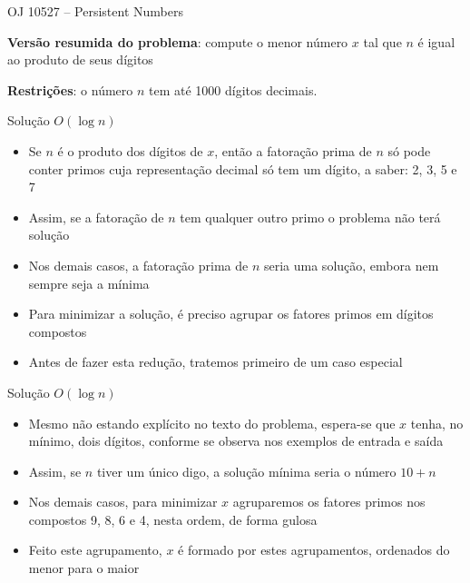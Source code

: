 \begin{frame}[fragile]{OJ 10527 -- Persistent Numbers}

    \textbf{Versão resumida do problema}: compute o menor número $x$ tal que $n$ é igual ao 
        produto de seus dígitos
    \vspace{0.1in}

    \textbf{Restrições}: o número $n$ tem até 1000 dígitos decimais.
\end{frame}

\begin{frame}[fragile]{Solução $O(\log n)$}

    \begin{itemize}
        \item Se $n$ é o produto dos dígitos de $x$, então a fatoração prima de $n$ só pode
            conter primos cuja representação decimal só tem um dígito, a saber: 2, 3, 5 e 7

        \item Assim, se a fatoração de $n$ tem qualquer outro primo o problema não
            terá solução

        \item Nos demais casos, a fatoração prima de $n$ seria uma solução, embora nem sempre
            seja a mínima

        \item Para minimizar a solução, é preciso agrupar os fatores primos em dígitos compostos

        \item Antes de fazer esta redução, tratemos primeiro de um caso especial
    \end{itemize}

\end{frame}


\begin{frame}[fragile]{Solução $O(\log n)$}

    \begin{itemize}
        \item Mesmo não estando explícito no texto do problema, espera-se que $x$ tenha, no 
            mínimo, dois dígitos, conforme se observa nos exemplos de entrada e saída

        \item Assim, se $n$ tiver um único digo, a solução mínima seria o número $10 + n$

        \item Nos demais casos, para minimizar $x$ agruparemos os fatores primos nos compostos
            9, 8, 6 e 4, nesta ordem, de forma gulosa

        \item Feito este agrupamento, $x$ é formado por estes agrupamentos, ordenados do
            menor para o maior
    \end{itemize}

\end{frame}


